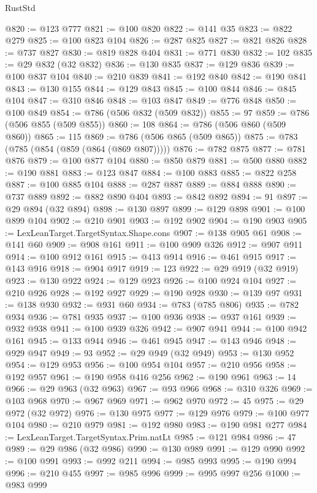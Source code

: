 \begin{lexlean}{RustStd}
\begin{coremodule}
@820 := @123 @777
@821 := @100 @820
@822 := @141 @35
@823 := @822 @279
@825 := @100 @823 @104
@826 := @287 @825
@827 := @821 @826
@828 := @737 @827
@830 := @819 @828 @404
@831 := @771 @830
@832 := 102
@835 := @29 @832 (@32 @832)
@836 := @130 @835
@837 := @129 @836
@839 := @100 @837 @104
@840 := @210 @839
@841 := @192 @840
@842 := @190 @841
@843 := @130 @155
@844 := @129 @843
@845 := @100 @844
@846 := @845 @104
@847 := @310 @846
@848 := @103 @847
@849 := @776 @848
@850 := @100 @849
@854 := @786 (@506 @832 (@509 @832))
@855 := 97
@859 := @786 (@506 @855 (@509 @855))
@860 := 108
@864 := @786 (@506 @860 (@509 @860))
@865 := 115
@869 := @786 (@506 @865 (@509 @865))
@875 := @783 (@785 (@854 (@859 (@864 (@869 @807)))))
@876 := @782 @875
@877 := @781 @876
@879 := @100 @877 @104
@880 := @850 @879
@881 := @500 @880
@882 := @190 @881
@883 := @123 @847
@884 := @100 @883
@885 := @822 @258
@887 := @100 @885 @104
@888 := @287 @887
@889 := @884 @888
@890 := @737 @889
@892 := @882 @890 @404
@893 := @842 @892
@894 := 91
@897 := @29 @894 (@32 @894)
@898 := @130 @897
@899 := @129 @898
@901 := @100 @899 @104
@902 := @210 @901
@903 := @192 @902
@904 := @190 @903
@905 := LexLeanTarget.TargetSyntax.Shape.cons
@907 := @138 @905 @61
@908 := @141 @60
@909 := @908 @161
@911 := @100 @909 @326
@912 := @907 @911
@914 := @100 @912 @161
@915 := @413 @914
@916 := @461 @915
@917 := @143 @916
@918 := @904 @917
@919 := 123
@922 := @29 @919 (@32 @919)
@923 := @130 @922
@924 := @129 @923
@926 := @100 @924 @104
@927 := @210 @926
@928 := @192 @927
@929 := @190 @928
@930 := @139 @97
@931 := @138 @930
@932 := @931 @60
@934 := @783 (@785 @806)
@935 := @782 @934
@936 := @781 @935
@937 := @100 @936
@938 := @937 @161
@939 := @932 @938
@941 := @100 @939 @326
@942 := @907 @941
@944 := @100 @942 @161
@945 := @133 @944
@946 := @461 @945
@947 := @143 @946
@948 := @929 @947
@949 := 93
@952 := @29 @949 (@32 @949)
@953 := @130 @952
@954 := @129 @953
@956 := @100 @954 @104
@957 := @210 @956
@958 := @192 @957
@961 := @190 @958 @416 @256
@962 := @190 @961
@963 := 14
@966 := @29 @963 (@32 @963)
@967 := @93 @966
@968 := @310 @326
@969 := @103 @968
@970 := @967 @969
@971 := @962 @970
@972 := 45
@975 := @29 @972 (@32 @972)
@976 := @130 @975
@977 := @129 @976
@979 := @100 @977 @104
@980 := @210 @979
@981 := @192 @980
@983 := @190 @981 @277
@984 := LexLeanTarget.TargetSyntax.Prim.natLt
@985 := @121 @984
@986 := 47
@989 := @29 @986 (@32 @986)
@990 := @130 @989
@991 := @129 @990
@992 := @100 @991
@993 := @992 @211
@994 := @985 @993
@995 := @190 @994
@996 := @210 @455
@997 := @985 @996
@999 := @995 @997 @256
@1000 := @983 @999

\end{coremodule}
\end{lexlean}
